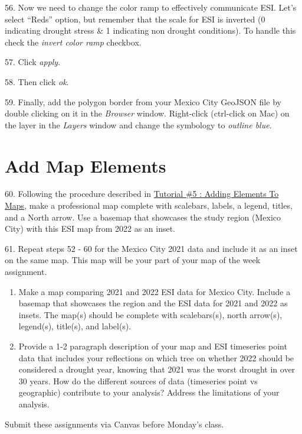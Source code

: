 \documentclass[oneside,a4paper,11pt,explicit]{book}
\begin{document}
56. Now we need to change the color ramp to effectively communicate ESI. Let's select ``Reds'' option, but remember that the scale for ESI is inverted (0 indicating drought stress \& 1 indicating non drought conditions). To handle this check the \textit{invert color ramp} checkbox. 

57. Click \textit{apply}.

58. Then click \textit{ok}.

59. Finally, add the polygon border from your Mexico City GeoJSON file by double clicking on it in the \textit{Browser} window. Right-click (ctrl-click on Mac) on the layer in the \textit{Layers} window and change the symbology to \textit{outline blue}. 

\section{Add Map Elements}

60. Following the procedure described in \href{https://jeremydforsythe.github.io/icecream-tutorials/Tutorial5_AddingElementsToMaps/Tutorial5_AddingElementsToMaps.pdf}{Tutorial \#5 : Adding Elements To Maps}, make a professional map complete with scalebars, labels, a legend, titles, and a North arrow. Use a basemap that showcases the study region (Mexico City) with this ESI map from 2022 as an inset. 

61. Repeat steps 52 - 60 for the Mexico City 2021 data and include it as an inset on the same map. This map will be your part of your map of the week assignment.

\begin{tcolorbox}[colback=yellow!5!white,colframe=IceCreamOrbit,title= \vspace{.2em} \Large Map of the Week Assignments]
	\large
	\begin{enumerate}
		\item Make a map comparing 2021 and 2022 ESI data for Mexico City. Include a basemap that showcases the region and the ESI data for 2021 and 2022 as insets. The map(s) should be complete with scalebars(s), north arrow(s), legend(s), title(s), and label(s).
        \item Provide a 1-2 paragraph description of your map and ESI timeseries point data that includes your reflections on which tree on whether 2022 should be considered a drought year, knowing that 2021 was the worst drought in over 30 years. How do the different sources of data (timeseries point vs geographic) contribute to your analysis? Address the limitations of your analysis.
	\end{enumerate}
	Submit these assignments via Canvas before Monday's class.
\end{tcolorbox}
\end{document}
